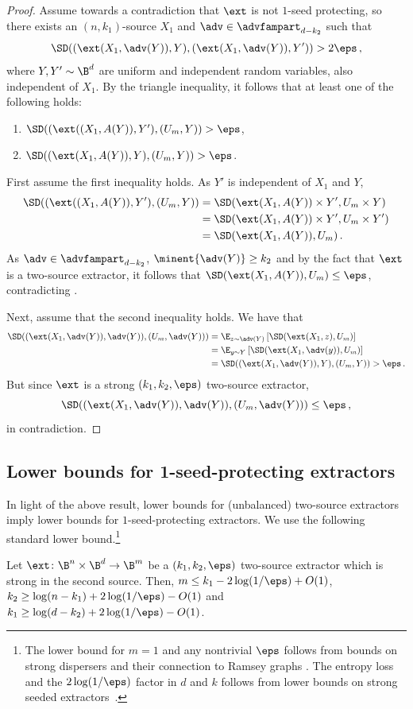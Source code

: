 \begin{proof}
Assume towards a contradiction that $\ext$ is not $1$-seed protecting,
so there exists an $(n,k_1)$-source $X_1$ and $\adv \in \advfampart_{d-k_2}$
such that
	\[
	\SD((\ext(X_1,\adv(Y)), Y), (\ext(X_1,\adv(Y)), Y')) > 2\eps\,,
	\]
where $Y, Y' \sim \B^d$ are uniform and independent random variables, also
independent of $X_1$.
	By the triangle inequality, it follows that at least one of the following holds:
\begin{enumerate}
\item\label{it:tw-source1} $\SD((\ext((X_1,A(Y)), Y'), (U_{m}, Y)) > \eps$,
\item $\SD((\ext(X_1,A(Y)), Y), (U_{m}, Y)) > \eps$.
\end{enumerate}	
First assume the first inequality holds. As $Y'$ is independent of $X_1$ and $Y$,
\begin{align*}
\SD((\ext((X_1,A(Y)), Y'), (U_{m}, Y)) &= 
\SD(\ext(X_1,A(Y)) \times Y', U_m \times Y) \\
&= \SD(\ext(X_1,A(Y)) \times Y', U_m \times Y') \\ &= \SD(\ext(X_1,A(Y)) , U_m)\,.
\end{align*}
As $\adv \in \advfampart_{d-k_2}$, $\minent{\adv(Y)} \ge k_2$ and by the fact that $\ext$ is a two-source extractor, it follows that  $\SD(\ext(X_1,A(Y)) , U_m) \le \eps$,
contradicting .
	
Next, assume that the second inequality holds.
We have that 
\begin{align*}
	\SD((\ext(X_1,\adv(Y)), \adv(Y)), (U_{m}, \adv(Y))) &= \E_{z \sim \adv(Y)}\left[ \SD(\ext(X_1,z),U_{m}) \right] \\
	&= \E_{y \sim Y}\left[ \SD(\ext(X_1,\adv(y)),U_{m}) \right] \\
	&=\SD((\ext(X_1,\adv(Y)), Y), (U_{m}, Y)) > \eps\,.
\end{align*}
But since $\ext$ is a strong $(k_1,k_2,\eps)$ two-source extractor,
\[\SD((\ext(X_1,\adv(Y)), \adv(Y)), (U_{m}, \adv(Y))) \le \eps\,,\] in contradiction.
\end{proof}

\subsection{Lower bounds for 1-seed-protecting extractors}

%
In light of the above result, lower bounds for (unbalanced) two-source 
extractors imply lower bounds for $1$-seed-protecting extractors.
We use the following standard lower bound.\footnote{The lower bound for
$m = 1$ and any nontrivial $\eps$ follows from bounds on strong dispersers
and their connection to Ramsey graphs \cite{RTS00,BDT20}. The entropy loss
and the $2\log(1/\eps)$ factor in $d$ and $k$ follows from lower bounds
on strong seeded extractors~\cite{RTS00}.}
\begin{theorem}
Let $\ext \colon \B^{n} \times \B^{d} \rightarrow \B^{m}$ be a 
$(k_1,k_2,\eps)$ two-source extractor which is strong in the second source. Then,
$m \le k_1 - 2\log(1/\eps)+O(1)$, $k_2 \ge \log(n-k_1)+2\log(1/\eps)-O(1)$
and $k_1 \ge \log(d-k_2)+2\log(1/\eps)-O(1)$.
\end{theorem}

